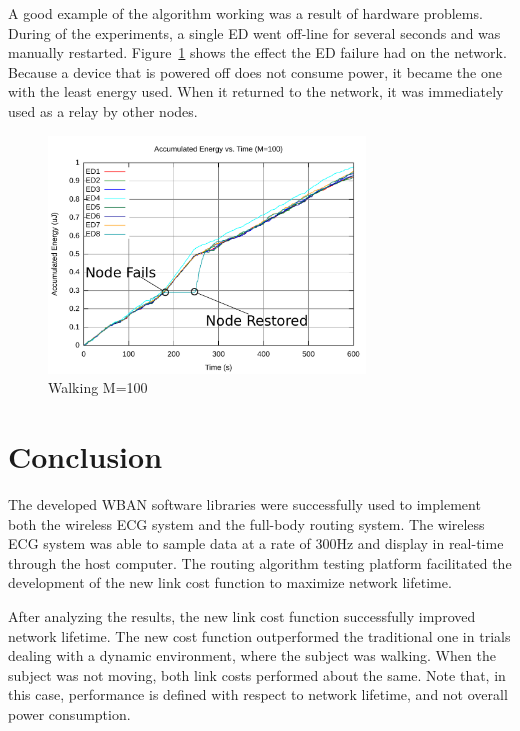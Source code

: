 \documentclass{article}
\begin{document}
A good example of the algorithm working was a result of hardware problems. During of the experiments, a single ED went off-line for several seconds and was manually restarted. Figure~\ref{fig:walk4-c100} shows the effect the ED failure had on the network. Because a device that is powered off does not consume power, it became the one with the least energy used. When it returned to the network, it was immediately used as a relay by other nodes.

\begin{figure}[!ht]
\begin{center}
\includegraphics[width=0.75\textwidth]{figures/walk4-c100.pdf}
\caption{Walking M=100}
\label{fig:walk4-c100}
\end{center}
\end{figure}

\section{Conclusion}
The developed WBAN software libraries were successfully used to implement both the wireless ECG system and the full-body routing system. The wireless ECG system was able to sample data at a rate of 300Hz and display in real-time through the host computer. The routing algorithm testing platform facilitated the development of the new link cost function to maximize network lifetime.

After analyzing the results, the new link cost function successfully improved network lifetime. The new cost function outperformed the traditional one in trials dealing with a dynamic environment, where the subject was walking. When the subject was not moving, both link costs performed about the same. Note that, in this case, performance is defined with respect to network lifetime, and not overall power consumption.
\end{document}
